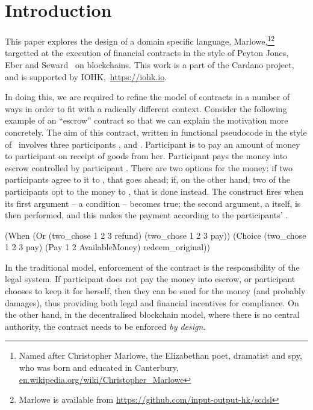 \documentclass[runningheads]{llncs}
\begin{document}
\section{Introduction}



This paper explores the design of a domain specific language, Marlowe,\footnote{Named after Christopher 
Marlowe, the Elizabethan poet, dramatist and spy, who was born and educated in Canterbury,  \url{en.wikipedia.org/wiki/Christopher_Marlowe}}\footnote{Marlowe is available 
from \url{https://github.com/input-output-hk/scdsl}} targetted at the execution of financial contracts in the style of 
Peyton Jones, Eber and Seward~\cite{PeytonJones:2000} on blockchains. This work is a part of the Cardano project, and is 
supported by IOHK,~\url{https://iohk.io}.

In doing this, we are required to refine the model of contracts in a number of ways in order to fit with a radically 
different context. Consider the following example of an ``escrow'' contract so that we can explain the motivation 
more concretely. The aim of this contract, written in functional pseudocode in the style of~\cite{PeytonJones:2000} 
involves three participants ,  and . Participant  is 
to pay an amount of money to participant  on receipt of goods from her. Participant  
pays the money into escrow controlled by participant . There are two options for the money: if two 
participants agree to  it to , that goes ahead; if, on the other hand, two of the 
participants opt to  the money to , that is done instead. The 
 construct fires when its first argument -- a condition -- becomes true; the second argument, a 
 itself, is then performed, and this makes the payment according to the participants' 
.

\begin{haskellcode}
(When (Or (two_chose 1 2 3 refund)
          (two_chose 1 2 3 pay))
      (Choice (two_chose 1 2 3 pay)
              (Pay 1 2 AvailableMoney)
              redeem_original))
\end{haskellcode}

In the traditional model, enforcement of the contract is the responsibility of the legal system. If participant 
 does not pay the money into escrow, or participant  chooses to keep it for herself, 
then they can be sued for the money (and probably damages), thus providing both legal and 
financial incentives for compliance. On the other hand, in the decentralised blockchain model, where there is no central 
authority, the contract needs to be enforced \emph{by design}. 
\end{document}
